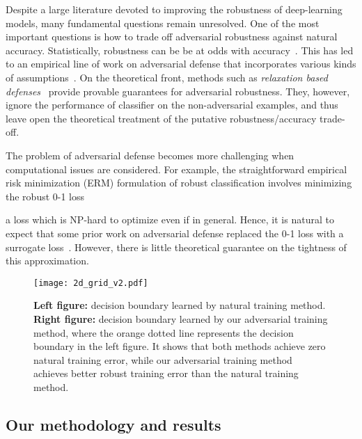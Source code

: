\documentclass[11pt]{article}
\newcommand{\0}{\mathbf{0}}
\newcommand{\1}{\mathbf{1}}
\begin{document}
Despite a large literature devoted to improving the robustness of deep-learning models, many fundamental questions remain unresolved. One of the most important questions is how to trade off adversarial robustness against natural accuracy. Statistically, robustness can be be at odds with accuracy~\cite{tsipras2018robustness}. This has led to an empirical line of work on adversarial defense that incorporates various kinds of assumptions~\cite{su2018robustness,kurakin2016adversarial}. On the theoretical front, methods such as \emph{relaxation based defenses}~\cite{kolter2017provable,raghunathan2018certified}  provide provable guarantees for adversarial robustness. They, however, ignore the performance of classifier on the non-adversarial examples, and thus leave open the theoretical treatment of the putative robustness/accuracy trade-off.

The problem of adversarial defense becomes more challenging when computational issues are considered. For example, the straightforward empirical risk minimization (ERM) formulation of robust classification involves minimizing the robust 0-1 loss

a loss which is NP-hard to optimize even if  in general. Hence, it is natural to expect that some prior work on adversarial defense replaced the 0-1 loss  with a surrogate loss~\cite{madry2018towards,kurakin2016adversarial,pmlr-v80-uesato18a}. However, there is little theoretical guarantee on the tightness of this approximation. 





\begin{figure}
\centering
\texttt{[image: 2d\_grid\_v2.pdf]}
\caption{\textbf{Left figure:} decision boundary learned by natural training method. \textbf{Right figure:} decision boundary learned by our adversarial training method, where the orange dotted line represents the decision boundary in the left figure. It shows that both methods achieve zero natural training error, while our adversarial training method achieves better robust training error than the natural training method.}
\label{figure: intro}
\end{figure}

\subsection{Our methodology and results}
\end{document}
